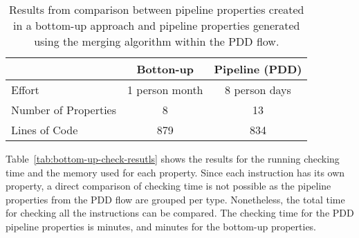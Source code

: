 \begin{table*}[htb!] 
	\centering 
	\caption{Results from comparison between pipeline properties created in a bottom-up approach and pipeline properties generated using the merging algorithm within the PDD flow.} 
	\label{tab:bottom-up-ppt-resutls}
	\begin{tabular}{p{5cm} c c} 
		  &  \textbf{Botton-up} & \textbf{Pipeline (PDD)} \\     
		\hline	
		Effort  &  1 person month &  8 person days\\
		Number of Properties  &  8 & 13 \\
		Lines of Code  & 879  &  834\\
	\end{tabular}
\end{table*}

Table~\ref{tab:bottom-up-check-resutls} shows the results for the running checking time and the memory used for each property. Since each instruction has its own property, a direct comparison of checking time is not possible as the pipeline properties from the PDD flow are grouped per type. Nonetheless, the total time for checking all the instructions can be compared. The checking time for the PDD pipeline properties is  minutes, and  minutes for the bottom-up properties.

